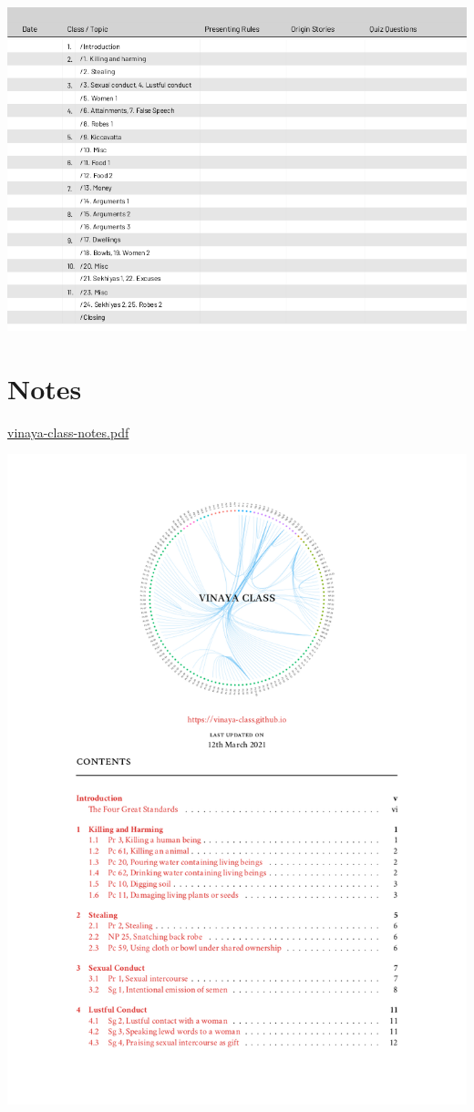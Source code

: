 \href{./includes/docs/sign-up-sheet.pdf}{\includegraphics{./includes/docs/sign-up-sheet-thumb.png}}

\section{Notes}

\href{./includes/docs/vinaya-class-notes.pdf}{vinaya-class-notes.pdf}

\href{./includes/docs/vinaya-class-notes.pdf}{\includegraphics{./includes/docs/vinaya-class-notes-thumb.png}}

